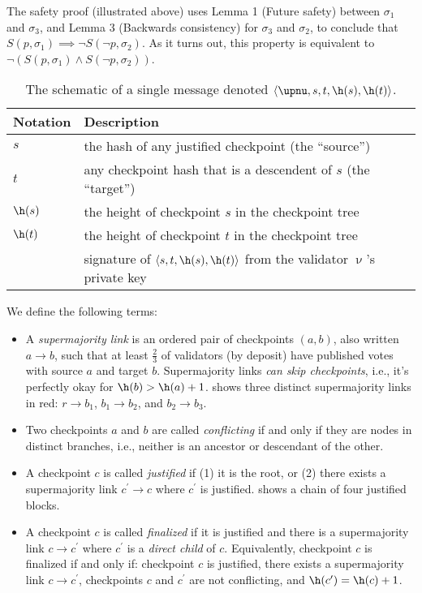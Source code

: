 \documentclass{article}
\begin{document}
The safety proof (illustrated above) uses Lemma 1 (Future safety) between $\sigma_1$ and $\sigma_3$, and Lemma 3 (Backwards consistency) for $\sigma_3$ and $\sigma_2$, to conclude that $S(p,\sigma_1) \implies \neg{S(\neg{p},\sigma_2)}$. As it turns out, this property is equivalent to $\neg{(S(p,\sigma_1)\land S(\neg{p},\sigma_2))}$.
\begin{table}[bth]
\centering

   \begin{tabular}{l l}
	\toprule
	\textbf{Notation} & \textbf{Description} \\
	\midrule
	$s$ & the hash of any justified checkpoint (the ``source'') \\
	$t$ & any checkpoint hash that is a descendent of  $s$ (the ``target'') \\
	$\h(s)$ & the height of checkpoint $s$ in the checkpoint tree \\
	$\h(t)$ & the height of checkpoint $t$ in the checkpoint tree \\
	\signature & signature of $\left\langle s, t, \h(s), \h(t) \right\rangle$ from the validator $\upnu$'s private key \\
	\bottomrule
	\end{tabular}


\vspace{0.15in}
\caption{The schematic of a single \msgVOTE message denoted $\left\langle \upnu, s, t, \h(s), \h(t) \right\rangle$.}
\label{tbl:messages}
\end{table}
We define the following terms:
\begin{itemize}
\item A \emph{supermajority link} is an ordered pair of checkpoints $(a, b)$, also written $a \rightarrow b$, such that at least $\frac{2}{3}$ of validators (by deposit) have published votes with source $a$ and target $b$.  Supermajority links \emph{can skip checkpoints}, i.e., it's perfectly okay for $\h(b) > \h(a) + 1$.   shows three distinct supermajority links in red: $r \to b_1$, $b_1 \to b_2$, and $b_2 \to b_3$.

\item Two checkpoints $a$ and $b$ are called \emph{conflicting} if and only if they are nodes in distinct branches, i.e., neither is an ancestor or descendant of the other.

\item A checkpoint $c$ is called \emph{justified} if (1) it is the root, or (2) there exists a supermajority link $c^\prime \to c$ where $c^\prime$ is justified.   shows a chain of four justified blocks.

\item A checkpoint $c$ is called \emph{finalized} if it is justified and there is a supermajority link $c \to c^\prime$ where $c^\prime$ is a \emph{direct child} of $c$.  Equivalently, checkpoint $c$ is finalized if and only if: checkpoint $c$ is justified, there exists a supermajority link $c \to c^\prime$, checkpoints $c$ and $c^\prime$ are not conflicting, and $\h(c^\prime) = \h(c) + 1$.
\end{itemize}
\end{document}
